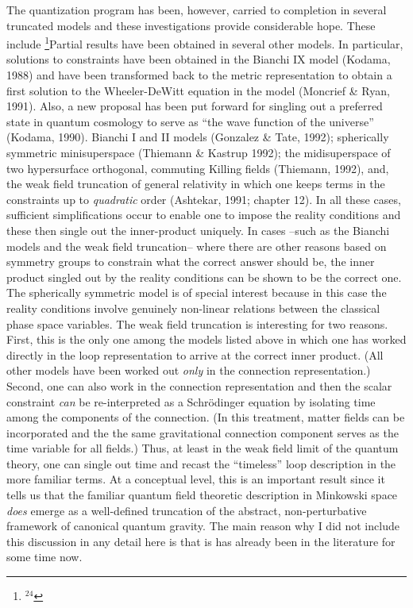 The quantization program has been, however, carried to completion in several
truncated models and these investigations provide considerable hope.
These include%
\footnote{$^{24}$}{Partial results have been obtained in several other models.
In particular, solutions to constraints have been obtained in the Bianchi
IX model (Kodama, 1988) and have been transformed back to the metric
representation to obtain a first solution to the Wheeler-DeWitt equation
in the model (Moncrief \& Ryan, 1991). Also, a new proposal has been
put forward for singling out a preferred state in quantum cosmology to
serve as ``the wave function of the universe'' (Kodama, 1990).}
Bianchi I and II models (Gonzalez \& Tate, 1992); spherically
symmetric minisuperspace (Thiemann \& Kastrup 1992); the midisuperspace
of two hypersurface orthogonal, commuting Killing fields (Thiemann, 1992),
and, the weak field truncation of general relativity in which one keeps
terms in the constraints up to {\it quadratic} order (Ashtekar, 1991;
chapter 12). In
all these cases, sufficient simplifications occur to enable one to impose
the reality conditions and these then single out the inner-product
uniquely. In cases --such as the Bianchi models and the weak field
truncation-- where there are other reasons based on symmetry groups to
constrain what the correct answer should be, the inner product singled
out by the reality conditions can be shown to be the correct one. The
spherically symmetric model is of special interest because in this case
the reality conditions involve genuinely non-linear relations between the
classical phase space variables. The weak field truncation is interesting
for two reasons. First, this is the only one among the models listed above
in which one has worked directly in the loop representation to arrive at
the correct inner product. (All other models have been worked out {\it only}
in the connection representation.) Second, one can also work in the connection
representation and then the scalar constraint {\it can} be re-interpreted
as a Schr\"odinger equation by isolating time among the components of the
connection. (In this treatment, matter fields can be incorporated and the
the same gravitational connection component serves as the time variable for
all fields.) Thus, at least in the weak field limit of the quantum theory,
one can single out time and recast the ``timeless'' loop description in
the more familiar terms. At a conceptual level, this is an important result
since it tells us that the familiar quantum field theoretic description in
Minkowski space {\it does} emerge as a well-defined truncation of the abstract,
non-perturbative framework of canonical quantum gravity. The main reason why
I did not include this discussion in any detail here is that is has already
been in the literature for some time now.

